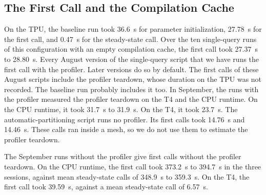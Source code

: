 \subsection{The First Call and the Compilation Cache}\label{sec:res-first}
On the TPU, the baseline run took 36.6~s for parameter initialization, 27.78~s for the first call, and 0.47~s for the steady-state call. %
Over the ten single-query runs of this configuration with an empty compilation cache, the first call took 27.37~s to 28.80~s. %
Every August version of the single-query script that we have runs the first call with the profiler. Later versions
do so by default. The first calls of these August scripts include the profiler teardown, whose duration on the TPU was not
recorded. The baseline run probably includes it too.
In September, the runs with the profiler measured the profiler teardown on the T4 and the CPU runtime. On the CPU runtime, it took 31.7~s to 31.9~s. %
On the T4, it took 23.7~s. %
The automatic-partitioning script runs no profiler. Its first calls took 14.76~s and 14.46~s. %
These calls ran inside a mesh, so we do not use them to estimate the profiler teardown.

The September runs without the profiler give first calls without the profiler teardown. On the CPU runtime, the first call took 373.2~s to 394.7~s in the three sessions, against mean steady-state calls of 348.9~s to 359.3~s. %
On the T4, the first call took 39.59~s, against a mean steady-state call of 6.57~s. %

